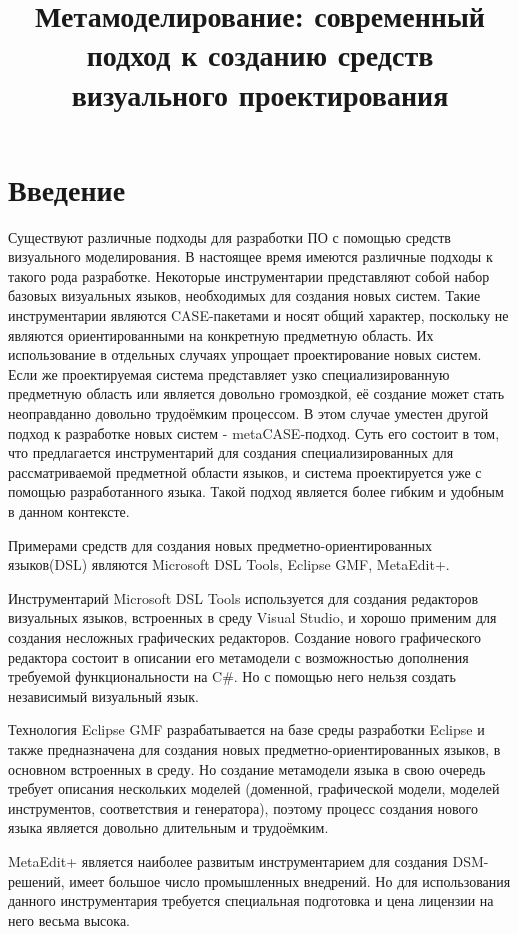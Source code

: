 \documentclass[a4paper]{article}
\title{Метамоделирование: современный подход к созданию средств визуального проектирования}
\date{}
\begin{document}
\maketitle
\thispagestyle{empty}

\section*{Введение}
Существуют различные подходы для разработки ПО с помощью средств визуального моделирования. В настоящее время имеются различные подходы к такого рода разработке. Некоторые инструментарии представляют собой набор базовых визуальных языков, необходимых для создания новых систем. Такие инструментарии являются CASE-пакетами и носят общий характер, поскольку не являются ориентированными на конкретную предметную область. Их использование в отдельных случаях упрощает проектирование новых систем. Если же проектируемая система представляет узко специализированную предметную область или является довольно громоздкой, её создание может стать неоправданно довольно трудоёмким процессом. В этом случае уместен другой подход к разработке новых систем - metaCASE-подход. Суть его состоит в том, что предлагается инструментарий для создания специализированных для рассматриваемой предметной области языков, и система проектируется уже с помощью разработанного языка. Такой подход является более гибким и удобным в данном контексте.

Примерами средств для создания новых предметно-ориентированных языков(DSL) являются Microsoft DSL Tools, Eclipse GMF, MetaEdit+.

Инструментарий Microsoft DSL Tools используется для создания редакторов визуальных языков, встроенных в среду Visual Studio, и хорошо применим для создания несложных графических редакторов. Создание нового графического редактора состоит в описании его метамодели с возможностью дополнения требуемой функциональности на C\#. Но с помощью него нельзя создать независимый визуальный язык. 

Технология Eclipse GMF разрабатывается на базе среды разработки Eclipse и также предназначена для создания новых предметно-ориентированных языков, в основном встроенных в среду. Но создание метамодели языка в свою очередь требует описания нескольких моделей (доменной, графической модели, моделей инструментов, соответствия и генератора), поэтому процесс создания нового языка является довольно длительным и трудоёмким.

MetaEdit+ является наиболее развитым инструментарием для создания DSM-решений, имеет большое число промышленных внедрений. Но для использования данного инструментария требуется специальная подготовка и цена лицензии на него весьма высока.
\end{document}

